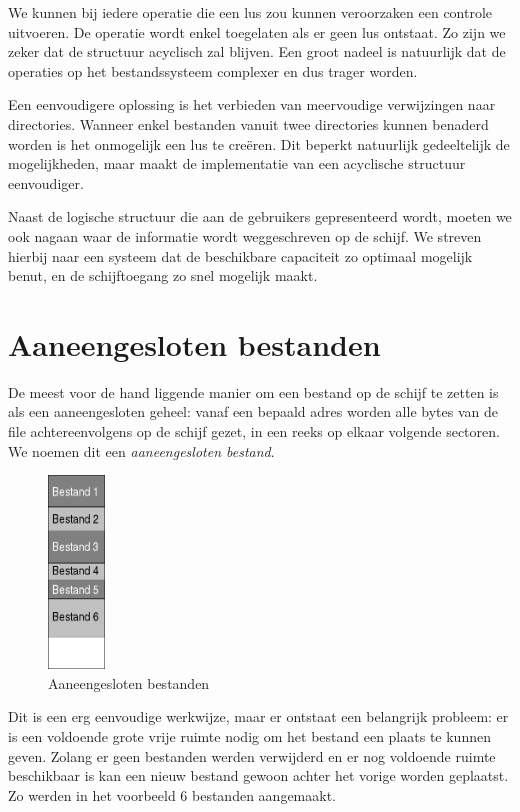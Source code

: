 We kunnen bij iedere operatie die een lus zou kunnen
veroorzaken een controle uitvoeren. De operatie wordt enkel
toegelaten als er geen lus ontstaat. Zo zijn we zeker dat de
structuur acyclisch zal blijven. Een groot nadeel is natuurlijk dat
de operaties op het bestandssysteem complexer en dus trager
worden.

Een eenvoudigere oplossing is het verbieden van meervoudige
verwijzingen naar directories. Wanneer enkel bestanden vanuit twee
directories kunnen benaderd worden is het onmogelijk een lus te
cre\"eren. Dit beperkt natuurlijk gedeeltelijk de mogelijkheden, maar
maakt de implementatie van een acyclische structuur
eenvoudiger.

Naast de logische structuur die aan de gebruikers
gepresenteerd wordt, moeten we ook nagaan waar de informatie wordt
weggeschreven op de schijf. We streven hierbij naar een systeem dat
de beschikbare capaciteit zo optimaal mogelijk benut, en de
schijftoegang zo snel mogelijk maakt.

\section{Aaneengesloten bestanden}

De meest voor de hand liggende manier om een bestand op de schijf
te zetten is als een aaneengesloten geheel: vanaf een bepaald adres
worden alle bytes van de file achtereenvolgens op de schijf gezet, in
een reeks op elkaar volgende sectoren. We noemen dit een
\emph{aaneengesloten bestand}.

\begin{figure}
\begin{center}
\includegraphics[width=15mm]{images/fig0405.png}
\caption{Aaneengesloten bestanden}
\end{center}
\end{figure}

Dit is een erg eenvoudige werkwijze, maar er ontstaat een
belangrijk probleem: er is een voldoende grote vrije ruimte nodig om het
bestand een plaats te kunnen geven. Zolang er geen bestanden werden
verwijderd en er nog voldoende ruimte beschikbaar is kan een nieuw
bestand gewoon achter het vorige worden geplaatst. Zo werden in het
voorbeeld 6 bestanden aangemaakt.

